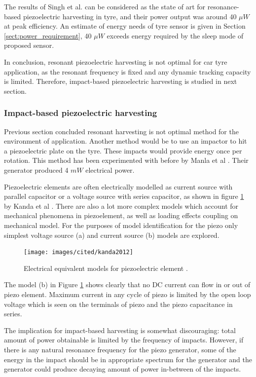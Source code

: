 The results of Singh et al. can be considered as the state of art for resonance-based piezoelectric harvesting in tyre, and their power output was around 40 $\mu W$ at peak efficiency. An estimate of energy needs of tyre sensor is given in Section \ref{sect:power_requirement}, 40 $\mu W$ exceeds energy required by the sleep mode of proposed sensor.

In conclusion, resonant piezoelectric harvesting is not optimal for car tyre application, as the resonant frequency is fixed and any dynamic tracking capacity is limited. Therefore, impact-based piezoelectric harvesting is studied in next section.

\subsubsection{Impact-based piezoelectric harvesting}
Previous section concluded resonant harvesting is not optimal method for the environment of application. Another method would be to use an impactor to hit a piezoelectric plate on the tyre. These impacts would provide energy once per rotation. This method has been experimented with before by Manla et al \cite{Manla2009}. Their generator produced 4 $mW$ electrical power.

Piezoelectric elements are often electrically modelled as current source with parallel capacitor or a voltage source with series capacitor, as shown in figure \ref{fig:piezo_equivalents} by Kanda et al \cite{Kanda2012}. There are also a lot more complex models which account for mechanical phenomena in piezoelement, as well as loading effects coupling on mechanical model. For the purposes of model identification for the piezo only simplest voltage source (a) and current source (b) models are explored.

\begin{figure}[htb]
  \begin{center}
  \texttt{[image: images/cited/kanda2012]}
  \end{center}
  \caption{Electrical equivalent models for piezoelectric element \cite{Kanda2012}.}
  \label{fig:piezo_equivalents}
\end{figure}

The model (b) in Figure \ref{fig:piezo_equivalents} shows clearly that no DC current can flow in or out of piezo element. Maximum current in any cycle of piezo is limited by the open loop voltage which is seen on the terminals of piezo and the piezo capacitance in series. 

The implication for impact-based harvesting is somewhat discouraging: total amount of power obtainable is limited by the frequency of impacts. However, if there is any natural resonance frequency for the piezo generator, some of the energy in the impact should be in appropriate spectrum for the generator and the generator could produce decaying amount of power in-between of the impacts.

